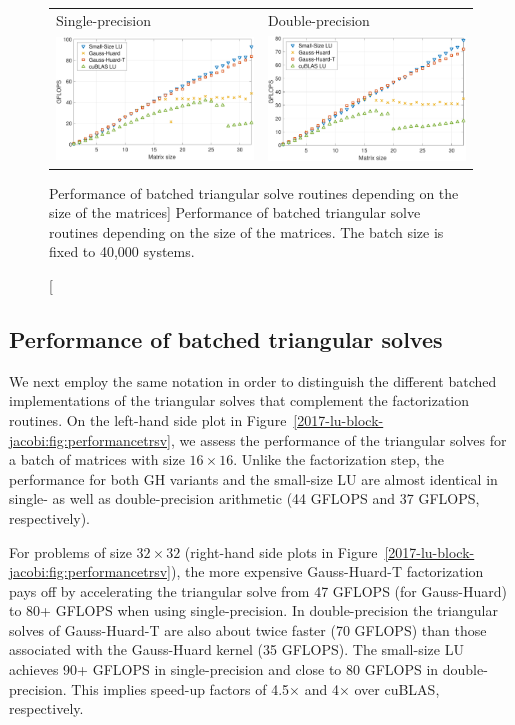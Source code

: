 \begin{figure}[t]
\begin{center}
\begin{tabular}{ll}
\hline
Single-precision & Double-precision\\
\includegraphics[width=.45\columnwidth]{plots/trsv_incsize_single.pdf}
&
\includegraphics[width=.45\columnwidth]{plots/trsv_incsize_double.pdf}\\
\end{tabular}
\end{center}
\caption
[Performance of batched triangular solve routines depending on the size of the
matrices]
{%
Performance of batched triangular solve routines depending on the size of the matrices.
The batch size is fixed to 40,000 systems.
}
\label{2017-lu-block-jacobi:fig:performancetrsvincsize}
\end{figure}


\subsection{Performance of batched triangular solves}
We next employ the same notation in order to distinguish the different batched implementations of
the triangular solves that complement the factorization routines.
On the left-hand side plot in Figure~\ref{2017-lu-block-jacobi:fig:performancetrsv}, we assess the performance
of the triangular solves for a batch of matrices with size $16\times16$.
Unlike the factorization step, the performance for both GH variants and
the small-size LU are almost identical in single- as well as double-precision arithmetic
(44 GFLOPS and 37 GFLOPS, respectively).


For problems of size $32\times32$ (right-hand side plots in Figure~\ref{2017-lu-block-jacobi:fig:performancetrsv}), 
the more expensive Gauss-Huard-T factorization pays off
by accelerating the triangular solve from 47 GFLOPS (for Gauss-Huard) to 80+ GFLOPS
when using single-precision. In  double-precision the triangular solves of 
Gauss-Huard-T are also about twice faster (70 GFLOPS) than those associated with the
Gauss-Huard kernel (35 GFLOPS).
The small-size LU achieves 90+ GFLOPS in single-precision and close to 80 GFLOPS in double-precision.
This implies speed-up factors of 4.5$\times$ and 4$\times$ over cuBLAS, respectively.


